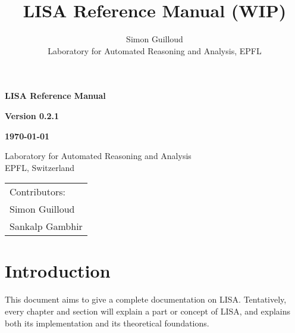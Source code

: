 \documentclass[11pt,a4paper]{book}
\title{LISA Reference Manual (WIP)}
\author{Simon Guilloud\\Laboratory for Automated Reasoning and Analysis, EPFL}
\date{}
\begin{document}
 

\newfontfamily{}

\begin{titlepage}
\titlefont 

    \begin{center}
        \vspace*{1cm}
 
        \textbf{\Huge LISA Reference Manual}
             
        \vspace{1.5cm}
        
        \textbf{\large Version 0.2.1}
        
        \textbf{\large \today}
             
        \vspace{1.5cm}
 
        {\Large Laboratory for Automated Reasoning and Analysis\\ EPFL, Switzerland}

        \vspace{1.5cm}

        \date{}

    \end{center}
    \vspace*{10em}
    \begin{flushright}\huge
        \begin{tabular}{l}
         Contributors: \hspace*{2em} \\[1em]
         Simon Guilloud\\
         Sankalp Gambhir
        \end{tabular}
    \end{flushright}
             
 \end{titlepage}
\chapter*{Introduction}

This document aims to give a complete documentation on LISA. Tentatively, every chapter and section will explain a part or concept of LISA, and explains both its implementation and its theoretical foundations. 

\tableofcontents













\end{document}
